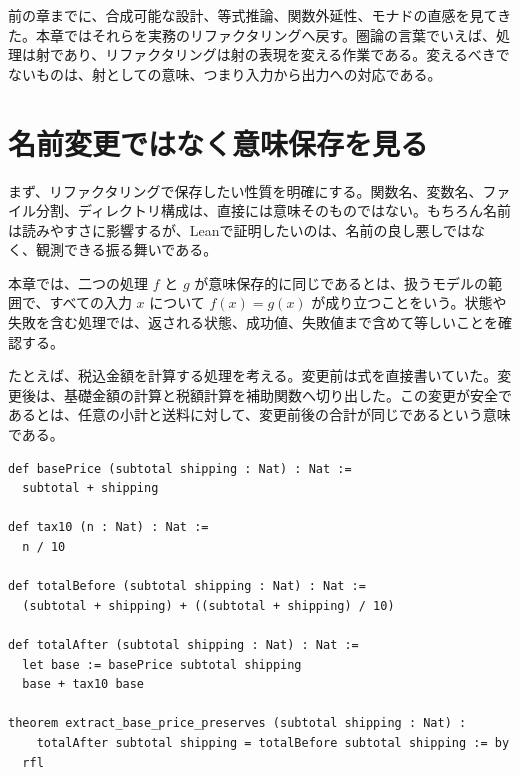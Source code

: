 
前の章までに、合成可能な設計、等式推論、関数外延性、モナドの直感を見てきた。本章ではそれらを実務のリファクタリングへ戻す。圏論の言葉でいえば、処理は射であり、リファクタリングは射の表現を変える作業である。変えるべきでないものは、射としての意味、つまり入力から出力への対応である。

\section{名前変更ではなく意味保存を見る}

まず、リファクタリングで保存したい性質を明確にする。関数名、変数名、ファイル分割、ディレクトリ構成は、直接には意味そのものではない。もちろん名前は読みやすさに影響するが、Leanで証明したいのは、名前の良し悪しではなく、観測できる振る舞いである。

\begin{definitionbox}
本章では、二つの処理 \(f\) と \(g\) が意味保存的に同じであるとは、扱うモデルの範囲で、すべての入力 \(x\) について \(f(x) = g(x)\) が成り立つことをいう。状態や失敗を含む処理では、返される状態、成功値、失敗値まで含めて等しいことを確認する。
\end{definitionbox}

たとえば、税込金額を計算する処理を考える。変更前は式を直接書いていた。変更後は、基礎金額の計算と税額計算を補助関数へ切り出した。この変更が安全であるとは、任意の小計と送料に対して、変更前後の合計が同じであるという意味である。

\begin{listing}[htbp]
\begin{verbatim}
def basePrice (subtotal shipping : Nat) : Nat :=
  subtotal + shipping

def tax10 (n : Nat) : Nat :=
  n / 10

def totalBefore (subtotal shipping : Nat) : Nat :=
  (subtotal + shipping) + ((subtotal + shipping) / 10)

def totalAfter (subtotal shipping : Nat) : Nat :=
  let base := basePrice subtotal shipping
  base + tax10 base

theorem extract_base_price_preserves (subtotal shipping : Nat) :
    totalAfter subtotal shipping = totalBefore subtotal shipping := by
  rfl
\end{verbatim}
\caption{関数抽出による意味保存}
\label{lst:ch28-extract-base-price}
\end{listing}

